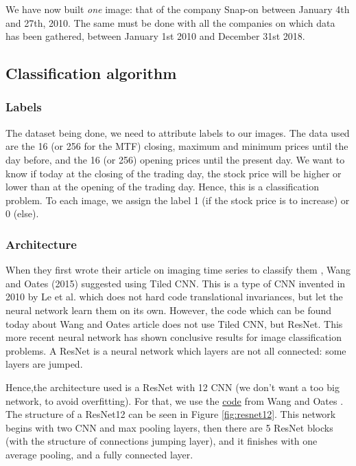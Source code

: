 \documentclass[11pt]{article}
\begin{document}
\begin{onehalfspace}
We have now built \textit{one} image: that of the company Snap-on between January 4th and 27th, 2010. The same must be done with all the companies on which data has been gathered, between January 1st 2010 and December 31st 2018.


\subsection{Classification algorithm}

\subsubsection{Labels}

The dataset being done, we need to attribute labels to our images. The data used are the 16 (or 256 for the MTF) closing, maximum and minimum prices until the day before, and the 16 (or 256) opening prices until the present day. We want to know if today at the closing of the trading day, the stock price will be higher or lower than at the opening of the trading day. Hence, this is a classification problem. To each image, we assign the label 1 (if the stock price is to increase) or 0 (else).

\subsubsection{Architecture}

When they first wrote their article on imaging time series to classify them \cite{wang}, Wang and Oates (2015) suggested using Tiled CNN. This is a type of CNN invented in 2010 \cite{le} by Le et al. which does not hard code translational invariances, but let the neural network learn them on its own. However, the code which can be found today about Wang and Oates article does not use Tiled CNN, but ResNet. This more recent neural network has shown conclusive results for image classification problems. A ResNet is a neural network which layers are not all connected: some layers are jumped. 

Hence,the architecture used is a ResNet with 12 CNN (we don't want a too big network, to avoid overfitting). For that, we use the \href{https://github.com/cauchyturing/UCR_Time_Series_Classification_Deep_Learning_Baseline/blob/master/ResNet.py}{code} from Wang and Oates \cite{wang}. The structure of a ResNet12 can be seen in Figure \ref{fig:resnet12}. This network begins with two CNN and max pooling layers, then there are 5 ResNet blocks (with the structure of connections jumping layer), and it finishes with one average pooling, and a fully connected layer.


\end{onehalfspace}
\end{document}
